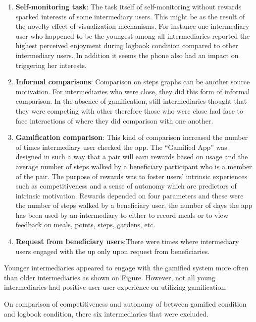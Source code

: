 \begin{enumerate}
\item{\textbf{Self-monitoring task}}: The task itself of self-monitoring without rewards sparked interests of some intermediary users. This might be as the result of the novelty effect of visualization mechanisms. For instance one intermediary user who happened to be the youngest among all intermediaries reported the highest perceived enjoyment during logbook condition compared to other intermediary users. In addition it seems the phone also had an impact on triggering her interests.
\item{\textbf{Informal comparisons}}: Comparison on steps graphs can be another source motivation. For intermediaries who were close, they did this form of informal comparison. In the absence of gamification, still intermediaries thought that they were competing with other therefore those who were close had face to face interactions of where they did comparison with one another. 
\item{\textbf{Gamification comparison}}: This kind of comparison increased the number of times intermediary user checked the app.
 The ``Gamified App'' was designed in such a way that a pair will earn rewards based on usage and the average number of steps walked by a beneficiary participant who is a member of the pair. The purpose of rewards was to foster users' intrinsic experiences such as competitiveness and a sense of autonomy which are predictors of intrinsic motivation. Rewards depended on four parameters and these were the number of steps walked by a beneficiary user, the number of days the app has been used by an intermediary to either to record meals or to view feedback on meals, points, steps, gardens, etc.
\item{\textbf{Request from beneficiary users}}:There were times where intermediary users engaged with the up only upon request from beneficiaries.  
\end{enumerate} 
Younger intermediaries appeared to engage with the gamified system more often than older intermediaries as shown on Figure. However, not all young intermediaries had positive user user experience on utilizing gamification. 



On comparison of competitiveness and autonomy of between gamified condition and logbook condition, there six intermediaries that were excluded.\newline

